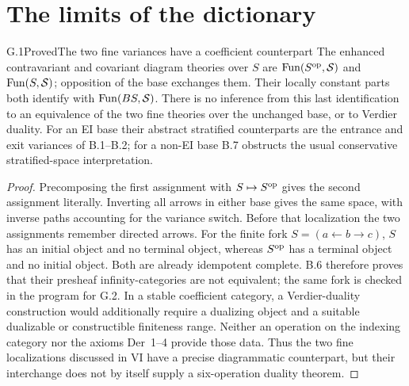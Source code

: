 \section{The limits of the dictionary}

\begin{statement}{G.1}{Proved}{The two fine variances have a coefficient counterpart}
The enhanced contravariant and covariant diagram theories over $S$ are
$\operatorname{Fun}(S^{\mathrm{op}},\mathcal S)$ and $\operatorname{Fun}(S,\mathcal S)$; opposition of the base
exchanges them. Their locally constant parts both identify with
$\operatorname{Fun}(BS,\mathcal S)$. There is no inference from this last identification
to an equivalence of the two fine theories over the unchanged base, or
to Verdier duality. For an EI base their abstract stratified counterparts
are the entrance and exit variances of B.1--B.2; for a non-EI base B.7
obstructs the usual conservative stratified-space interpretation.
\end{statement}
\begin{proof}
Precomposing the first assignment with $S\mapsto S^{\mathrm{op}}$ gives the
second assignment literally. Inverting all arrows in either base gives
the same space, with inverse paths accounting for the variance switch.
Before that localization the two assignments remember directed arrows.
For the finite fork $S=(a\leftarrow b\to c)$, $S$ has an initial
object and no terminal object, whereas $S^{\mathrm{op}}$ has a terminal object
and no initial object. Both are already idempotent complete. B.6
therefore proves that their presheaf infinity-categories are not
equivalent; the same fork is checked in the program for G.2.
In a stable coefficient category, a
Verdier-duality construction would additionally require a dualizing
object and a suitable dualizable or constructible finiteness range.
Neither an operation on the indexing category nor the axioms Der~1--4
provide those data. Thus the two fine localizations discussed in VI
have a precise diagrammatic counterpart, but their interchange does not
by itself supply a six-operation duality theorem.
\end{proof}

